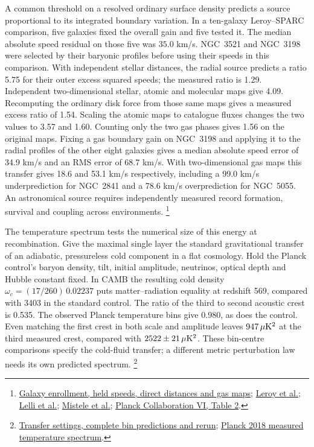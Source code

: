 \documentclass[11pt]{article}
\begin{document}
A common threshold on a resolved ordinary surface density predicts
a source proportional to its integrated boundary variation. In a
ten-galaxy Leroy--SPARC comparison, five galaxies fixed the overall
gain and five tested it. The median absolute speed residual on those
five was $35.0$ km/s. NGC~3521 and NGC~3198 were selected by their
baryonic profiles before using their speeds in this comparison.
With independent stellar distances, the radial source predicts a ratio
5.75 for their outer excess squared speeds; the measured ratio is 1.29.
Independent two-dimensional stellar, atomic and molecular maps give
4.09. Recomputing the ordinary disk force from those same maps gives
a measured excess ratio of 1.54. Scaling the atomic maps to catalogue
fluxes changes the two values to 3.57 and 1.60. Counting only the two
gas phases gives 1.56 on the original maps. Fixing a gas boundary gain
on NGC~3198 and applying it to the radial profiles of the other eight
galaxies gives a median absolute speed error of 34.9 km/s and an RMS
error of 68.7 km/s. With two-dimensional gas maps this transfer gives
18.6 and 53.1 km/s respectively, including a 99.0 km/s underprediction
for NGC~2841 and a 78.6 km/s overprediction for NGC~5055.
An astronomical source requires independently measured
record formation, survival and coupling across environments.%
\footnote{\href{https://github.com/FloatingPragma/observer-patch-holography/tree/main/code/cosmology/rar_deep_regime/boundary_source}{Galaxy enrollment, held speeds, direct distances and gas maps};
\href{https://doi.org/10.1088/0004-6256/136/6/2782}{Leroy et al.};
\href{https://doi.org/10.3847/0004-6256/152/6/157}{Lelli et al.};
\href{https://doi.org/10.3847/2041-8213/ad54b0}{Mistele et al.};
\href{https://doi.org/10.1051/0004-6361/201833910}{Planck Collaboration VI, Table 2}.}

The temperature spectrum tests the numerical size of this energy at
recombination. Give the maximal single layer the standard gravitational
transfer of an adiabatic, pressureless cold component in a flat cosmology.
Hold the Planck control's baryon density, tilt, initial amplitude,
neutrinos, optical depth and Hubble constant fixed. In CAMB the resulting
cold density $\omega_c=(17/260)\,0.02237$ puts matter--radiation equality
at redshift 569, compared with 3403 in the standard control. The ratio
of the third to second acoustic crest is 0.535. The observed Planck
temperature bins give 0.980, as does the control. Even matching the
first crest in both scale and amplitude leaves $947\,\mu{\rm K}^2$
at the third measured crest, compared with $2522\pm21\,\mu{\rm K}^2$.
These bin-centre comparisons specify the cold-fluid transfer; a different
metric perturbation law needs its own predicted spectrum.%
\footnote{\href{https://github.com/FloatingPragma/observer-patch-holography/tree/main/code/cosmology/cold_dilution/native_boundary}{Transfer settings, complete bin predictions and rerun};
\href{https://irsa.ipac.caltech.edu/data/Planck/release_3/ancillary-data/cosmoparams/COM_PowerSpect_CMB-TT-binned_R3.01.txt}{Planck 2018 measured temperature spectrum}.}
\end{document}
